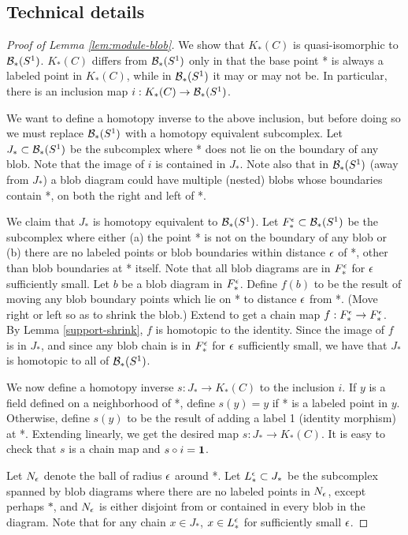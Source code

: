 \subsection{Technical details}
\begin{proof}[Proof of Lemma \ref{lem:module-blob}]
We show that $K_*(C)$ is quasi-isomorphic to ${\mathcal B}_*(S^1)$.
$K_*(C)$ differs from ${\mathcal B}_*(S^1)$ only in that the base point *
is always a labeled point in $K_*(C)$, while in ${\mathcal B}_*(S^1)$ it may or may not be.
In particular, there is an inclusion map $i: K_*(C) \to {\mathcal B}_*(S^1)$.

We want to define a homotopy inverse to the above inclusion, but before doing so
we must replace ${\mathcal B}_*(S^1)$ with a homotopy equivalent subcomplex.
Let $J_* \subset {\mathcal B}_*(S^1)$ be the subcomplex where * does not lie on the boundary
of any blob.
Note that the image of $i$ is contained in $J_*$.
Note also that in ${\mathcal B}_*(S^1)$ (away from $J_*$) 
a blob diagram could have multiple (nested) blobs whose
boundaries contain *, on both the right and left of *.

We claim that $J_*$ is homotopy equivalent to ${\mathcal B}_*(S^1)$.
Let $F_*^\epsilon \subset {\mathcal B}_*(S^1)$ be the subcomplex where either
(a) the point * is not on the boundary of any blob or
(b) there are no labeled points or blob boundaries within distance $\epsilon$ of *,
other than blob boundaries at * itself.
Note that all blob diagrams are in $F_*^\epsilon$ for $\epsilon$ sufficiently small.
Let $b$ be a blob diagram in $F_*^\epsilon$.
Define $f(b)$ to be the result of moving any blob boundary points which lie on *
to distance $\epsilon$ from *.
(Move right or left so as to shrink the blob.)
Extend to get a chain map $f: F_*^\epsilon \to F_*^\epsilon$.
By Lemma \ref{support-shrink}, $f$ is homotopic to the identity.
Since the image of $f$ is in $J_*$, and since any blob chain is in $F_*^\epsilon$
for $\epsilon$ sufficiently small, we have that $J_*$ is homotopic to all of ${\mathcal B}_*(S^1)$.

We now define a homotopy inverse $s: J_* \to K_*(C)$ to the inclusion $i$.
If $y$ is a field defined on a neighborhood of *, define $s(y) = y$ if
* is a labeled point in $y$.
Otherwise, define $s(y)$ to be the result of adding a label 1 (identity morphism) at *.
Extending linearly, we get the desired map $s: J_* \to K_*(C)$.
It is easy to check that $s$ is a chain map and $s \circ i = \boldsymbol{1}$.

Let $N_\epsilon$ denote the ball of radius $\epsilon$ around *.
Let $L_*^\epsilon \subset J_*$ be the subcomplex 
spanned by blob diagrams
where there are no labeled points
in $N_\epsilon$, except perhaps $*$, and $N_\epsilon$ is either disjoint from or contained in 
every blob in the diagram.
Note that for any chain $x \in J_*$, $x \in L_*^\epsilon$ for sufficiently small $\epsilon$.


\end{proof}
